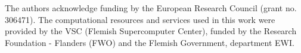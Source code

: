 \documentclass[wes, manuscript]{copernicus}
\begin{document}



\begin{acknowledgements}
The authors acknowledge funding by the European Research Council (grant no. 306471). The computational resources and services used in this work were provided by the VSC (Flemish Supercomputer Center), funded by the Research Foundation - Flanders (FWO) and the Flemish Government, department EWI.
\end{acknowledgements}




%
%
%






\end{document}
